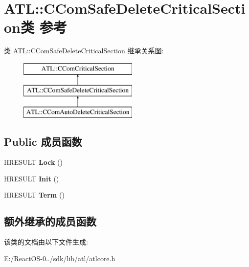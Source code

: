 \hypertarget{class_a_t_l_1_1_c_com_safe_delete_critical_section}{}\section{A\+TL\+:\+:C\+Com\+Safe\+Delete\+Critical\+Section类 参考}
\label{class_a_t_l_1_1_c_com_safe_delete_critical_section}
类 A\+TL\+:\+:C\+Com\+Safe\+Delete\+Critical\+Section 继承关系图\+:\begin{figure}[H]
\begin{center}
\leavevmode
\includegraphics[height=3.000000cm]{class_a_t_l_1_1_c_com_safe_delete_critical_section}
\end{center}
\end{figure}
\subsection*{Public 成员函数}
\begin{DoxyCompactItemize}
\item 
\mbox{\label{class_a_t_l_1_1_c_com_safe_delete_critical_section_a97812f147744b7c691b62e375445e7ce}} 
H\+R\+E\+S\+U\+LT {\bfseries Lock} ()
\item 
\mbox{\label{class_a_t_l_1_1_c_com_safe_delete_critical_section_a6936045b48e19a1d6bff4d0ee7b6b6b3}} 
H\+R\+E\+S\+U\+LT {\bfseries Init} ()
\item 
\mbox{\label{class_a_t_l_1_1_c_com_safe_delete_critical_section_a49537fdff5ff2bd221711dd77b4ced9c}} 
H\+R\+E\+S\+U\+LT {\bfseries Term} ()
\end{DoxyCompactItemize}
\subsection*{额外继承的成员函数}


该类的文档由以下文件生成\+:\begin{DoxyCompactItemize}
\item 
E\+:/\+React\+O\+S-\/0../sdk/lib/atl/atlcore.\+h\end{DoxyCompactItemize}
